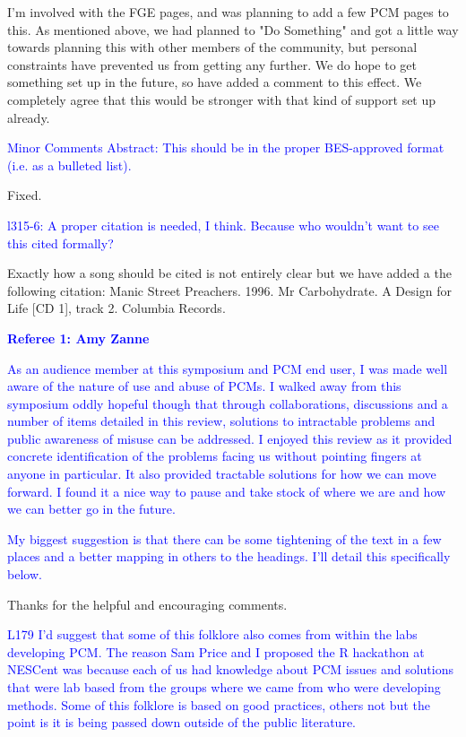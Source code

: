 \documentclass[12pt]{letter}
\begin{document}
\begin{letter}{}
I'm involved with the FGE pages, and was planning to add a few PCM pages to this. As mentioned above, we had planned to "Do Something" and got a little way towards planning this with other members of the community, but personal constraints have prevented us from getting any further. We do hope to get something set up in the future, so have added a comment to this effect. We completely agree that this would be stronger with that kind of support set up already.

\textcolor{blue}{Minor Comments
Abstract: This should be in the proper BES-approved format (i.e. as a bulleted list).}

Fixed.

\textcolor{blue}{l315-6: A proper citation is needed, I think. Because who wouldn't want to see this cited formally?}

Exactly how a song should be cited is not entirely clear but we have added a the following citation: Manic Street Preachers. 1996. Mr Carbohydrate. A Design for Life [CD 1], track 2. Columbia Records.

\textcolor{blue}{\textbf{Referee 1: Amy Zanne}}

\textcolor{blue}{As an audience member at this symposium and PCM end user, I was made well aware of the nature of use and abuse of PCMs. I walked away from this symposium oddly hopeful though that through collaborations, discussions and a number of items detailed in this review, solutions to intractable problems and public awareness of misuse can be addressed. I enjoyed this review as it provided concrete identification of the problems facing us without pointing fingers at anyone in particular. It also provided tractable solutions for how we can move forward. I found it a nice way to pause and take stock of where we are and how we can better go in the future.}

\textcolor{blue}{My biggest suggestion is that there can be some tightening of the text in a few places and a better mapping in others to the headings. I'll detail this specifically below.}

Thanks for the helpful and encouraging comments.

\textcolor{blue}{L179 I'd suggest that some of this folklore also comes from within the labs developing PCM. The reason Sam Price and I proposed the R hackathon at NESCent was because each of us had knowledge about PCM issues and solutions that were lab based from the groups where we came from who were developing methods. Some of this folklore is based on good practices, others not but the point is it is being passed down outside of the public literature.}


\end{letter}
\end{document}
